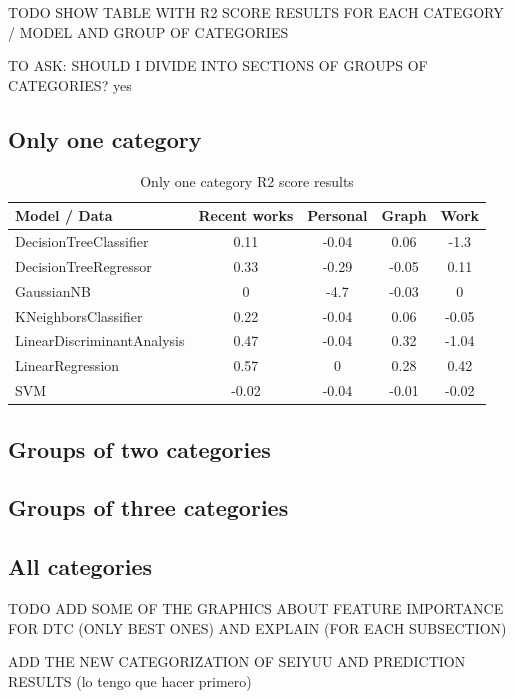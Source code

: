 TODO SHOW TABLE WITH R2 SCORE RESULTS FOR EACH CATEGORY / MODEL AND GROUP OF CATEGORIES

TO ASK: SHOULD I DIVIDE INTO SECTIONS OF GROUPS OF CATEGORIES? yes
\subsection{Only one category}
\begin{table}[!hbt]
	\begin{center}
	\caption{Only one category R2 score results}
	\label{tab:oneCategory}
	\begin{tabular}{|l|c|c|c|c|}
		\hline
		Model / Data & Recent works & Personal & Graph & Work \\ 
		\hline
		DecisionTreeClassifier & 0.11 & -0.04 & 0.06 & -1.3 \\ 
		\hline
		DecisionTreeRegressor & 0.33 & -0.29 & -0.05 & 0.11 \\ 
		\hline
		GaussianNB & 0 & -4.7 & -0.03 & 0 \\ 
		\hline
		KNeighborsClassifier & 0.22 & -0.04 & 0.06 & -0.05 \\ 
		\hline
		LinearDiscriminantAnalysis & 0.47 & -0.04 & 0.32 & -1.04 \\ 
		\hline
		LinearRegression & 0.57 & 0 & 0.28 & 0.42 \\ 
		\hline
		SVM & -0.02 & -0.04 & -0.01 & -0.02 \\ 
		\hline
	\end{tabular}
	\end{center}
\end{table}

\subsection{Groups of two categories}
\subsection{Groups of three categories}
\subsection{All categories}

TODO ADD SOME OF THE GRAPHICS ABOUT FEATURE IMPORTANCE FOR DTC (ONLY BEST ONES) AND EXPLAIN (FOR EACH SUBSECTION)

ADD THE NEW CATEGORIZATION OF SEIYUU AND PREDICTION RESULTS (lo tengo que hacer primero)
